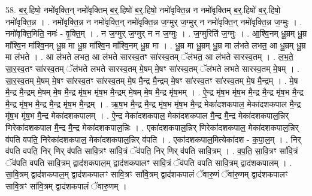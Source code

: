 \documentclass[17pt]{extarticle}
\begin{document}
58. ब॒र्॒.हिषो॒ नमो॑वृक्ति॒न् नमो॑वृक्तिम् ब॒र्॒.हिषो॑ ब॒र्॒.हिषो॒ नमो॑वृक्ति॒न्न न नमो॑वृक्तिम् ब॒र्॒.हिषो॑ ब॒र्॒.हिषो॒ नमो॑वृक्ति॒न्न । . नमो॑वृक्ति॒न्न न नमो॑वृक्ति॒न् नमो॑वृक्ति॒न्न ज॒ग्मुर् ज॒ग्मुर् न नमो॑वृक्ति॒न् नमो॑वृक्ति॒न्न ज॒ग्मुः । . नमो॑वृक्ति॒मिति॒ नमः॑ - वृ॒क्ति॒म् । . न ज॒ग्मुर् ज॒ग्मुर् न न ज॒ग्मुः । . ज॒ग्मुरिति॑ ज॒ग्मुः । . आ॒श्वि॒नम् धू॒म्रम् धू॒म्र मा᳚श्वि॒न मा᳚श्वि॒नम् धू॒म्र मा धू॒म्र मा᳚श्वि॒न मा᳚श्वि॒नम् धू॒म्र मा । . धू॒म्र मा धू॒म्रम् धू॒म्र मा ल॑भते लभत॒ आ धू॒म्रम् धू॒म्र मा ल॑भते । . आ ल॑भते लभत॒ आ ल॑भते सारस्व॒तꣳ सा॑रस्व॒तम् ॅल॑भत॒ आ ल॑भते सारस्व॒तम् । . ल॒भ॒ते॒ सा॒र॒स्व॒तꣳ सा॑रस्व॒तम् ॅल॑भते लभते सारस्व॒तम् मे॒षम् मे॒षꣳ सा॑रस्व॒तम् ॅल॑भते लभते सारस्व॒तम् मे॒षम् । . सा॒र॒स्व॒तम् मे॒षम् मे॒षꣳ सा॑रस्व॒तꣳ सा॑रस्व॒तम् मे॒ष मै॒न्द्र मै॒न्द्रम् मे॒षꣳ सा॑रस्व॒तꣳ सा॑रस्व॒तम् मे॒ष मै॒न्द्रम् । . मे॒ष मै॒न्द्र मै॒न्द्रम् मे॒षम् मे॒ष मै॒न्द्र मृ॑ष॒भ मृ॑ष॒भ मै॒न्द्रम् मे॒षम् मे॒ष मै॒न्द्र मृ॑ष॒भम् । . ऐ॒न्द्र मृ॑ष॒भ मृ॑ष॒भ मै॒न्द्र मै॒न्द्र मृ॑ष॒भ मै॒न्द्र मै॒न्द्र मृ॑ष॒भ मै॒न्द्र मै॒न्द्र मृ॑ष॒भ मै॒न्द्रम् । . ऋ॒ष॒भ मै॒न्द्र मै॒न्द्र मृ॑ष॒भ मृ॑ष॒भ मै॒न्द्र मेका॑दशकपाल॒ मेका॑दशकपाल मै॒न्द्र मृ॑ष॒भ मृ॑ष॒भ मै॒न्द्र मेका॑दशकपालम् । . ऐ॒न्द्र मेका॑दशकपाल॒ मेका॑दशकपाल मै॒न्द्र मै॒न्द्र मेका॑दशकपाल॒न्निर् णिरेका॑दशकपाल मै॒न्द्र मै॒न्द्र मेका॑दशकपाल॒न्निः । . एका॑दशकपाल॒न्निर् णिरेका॑दशकपाल॒ मेका॑दशकपाल॒न्निर् व॑पति वपति॒ निरेका॑दशकपाल॒ मेका॑दशकपाल॒न्निर् व॑पति । . एका॑दशकपाल॒मित्येका॑दश - क॒पा॒ल॒म् । . निर् व॑पति वपति॒ निर् णिर् व॑पति सावि॒त्रꣳ सा॑वि॒त्रं ॅव॑पति॒ निर् णिर् व॑पति सावि॒त्रम् । . व॒प॒ति॒ सा॒वि॒त्रꣳ सा॑वि॒त्रं ॅव॑पति वपति सावि॒त्रम् द्वाद॑शकपाल॒म् द्वाद॑शकपालꣳ सावि॒त्रं ॅव॑पति वपति सावि॒त्रम् द्वाद॑शकपालम् । . सा॒वि॒त्रम् द्वाद॑शकपाल॒म् द्वाद॑शकपालꣳ सावि॒त्रꣳ सा॑वि॒त्रम् द्वाद॑शकपालं ॅवारु॒णं ॅवा॑रु॒णम् द्वाद॑शकपालꣳ सावि॒त्रꣳ सा॑वि॒त्रम् द्वाद॑शकपालं ॅवारु॒णम् । \newline
\end{document}
